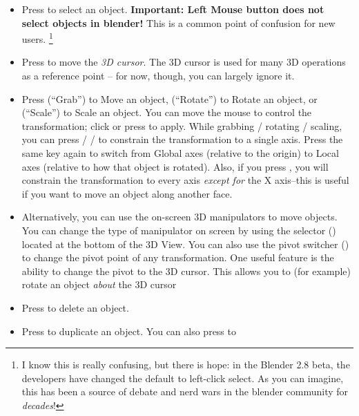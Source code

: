 \documentclass[11pt]{article}
\begin{document}
\begin{itemize}
    \item Press  to select an object.  \textbf{Important: Left Mouse button
    does not select objects in blender!}  This is a common point of confusion for new users.
    \footnote{I know this is really confusing,  but there is hope: in the Blender 2.8 beta, the 
    developers have changed the default to left-click select.  As you can imagine, this has been a
    source of debate and nerd wars in the blender community for \textit{decades}!}
    \item Press  to move the \textit{3D cursor}.  The 3D cursor is used for
    many 3D operations as a reference point -- for now, though, you can largely ignore it.
    \item Press  (``Grab'') to Move an object,  (``Rotate'') to Rotate an object,
    or  (``Scale'') to Scale an object.  You can move the mouse to control the 
    transformation; click  or press \keys{\return} to apply.  While grabbing
    / rotating / scaling, you can press  /  /  to constrain the 
    transformation to a single axis.  Press the same key again to switch from Global axes (relative
    to the origin) to Local axes (relative to how that object is rotated).  Also, if you press
    , you will constrain the transformation to every axis \textit{except for} the X
    axis--this is useful if you want to move an object along another face.
    \item Alternatively, you can use the on-screen 3D manipulators to move objects.  You can change
    the type of manipulator on screen by using the selector 
    () located at the bottom of the 3D View.  You can also use the pivot switcher
    () to change the pivot
    point of any transformation.  One useful feature is the ability to change the pivot to the 3D
    cursor.  This allows you to (for example) rotate an object \textit{about} the 3D cursor
    \item Press  to delete an object.
    \item Press  to duplicate an object.  You can also press  to 

\end{itemize}
\end{document}
